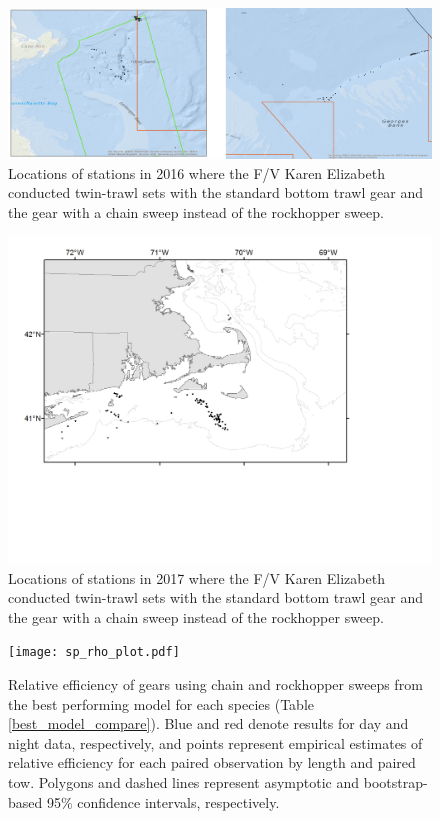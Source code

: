 \documentclass[]{article}
\begin{document}
\begin{figure}
\caption{Locations of stations in 2016 where the F/V Karen Elizabeth conducted twin-trawl sets with the standard bottom trawl gear and the gear with a chain sweep instead of the rockhopper sweep.}\label{2016_tow_locations}
\begin{center}
\includegraphics[width = \textwidth]{2016_tow_locations.png}
\end{center}
\end{figure}

\begin{figure}
\caption{Locations of stations in 2017 where the F/V Karen Elizabeth conducted twin-trawl sets with the standard bottom trawl gear and the gear with a chain sweep instead of the rockhopper sweep.}\label{2017_tow_locations}
\begin{center}
\includegraphics[width = \textwidth]{2017_tow_locations.png}
\end{center}
\end{figure}

\clearpage

\begin{figure}
\caption{Relative efficiency  of gears using chain and rockhopper sweeps from the best performing model for each species (Table \ref{best_model_compare}). Blue and red denote results for day and night data, respectively, and points represent empirical estimates of relative efficiency for each paired observation by length and paired tow. Polygons and dashed lines represent asymptotic and bootstrap-based 95\% confidence intervals, respectively.}\label{sp_rho_plot}
\begin{center}
\texttt{[image: sp\_rho\_plot.pdf]}
\end{center}
\end{figure}
\end{document}
